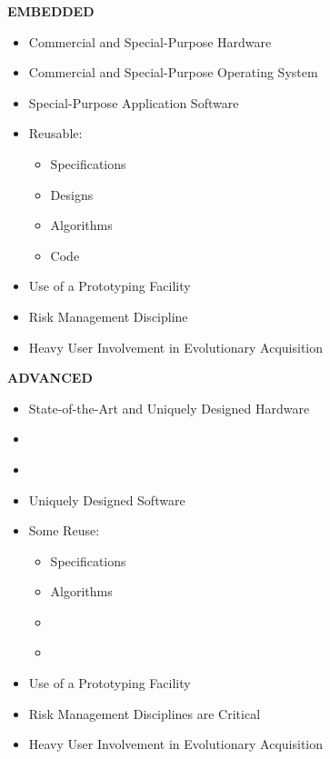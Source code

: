 \documentclass[11pt,final]{article}
\begin{document}
\begin{landscape}
\begin{center}
\begin{multicols*}{4}
    \textbf{EMBEDDED}
    \begin{itemize}
        \item Commercial and Special-Purpose Hardware
        \item Commercial and Special-Purpose Operating System
        \item Special-Purpose Application Software
        \item Reusable:
        \begin{itemize}
            \item Specifications
            \item Designs
            \item Algorithms
            \item Code
        \end{itemize}
        \item Use of a Prototyping Facility
        \item Risk Management Discipline
        \item Heavy User Involvement in Evolutionary Acquisition
    \end{itemize}

    \columnbreak

    \textbf{ADVANCED}

    \begin{itemize}
        \item State-of-the-Art and Uniquely Designed Hardware
        \item[] ~
        \item[] ~
        \item Uniquely Designed Software
        \item Some Reuse:
        \begin{itemize}
            \item Specifications
            \item Algorithms
        \item[] ~
        \item[] ~
        \end{itemize}
        \item Use of a Prototyping Facility
        \item Risk Management Disciplines are Critical
        \item Heavy User Involvement in Evolutionary Acquisition
    \end{itemize}

\end{multicols*}
\end{center}


\end{landscape}
\end{document}
